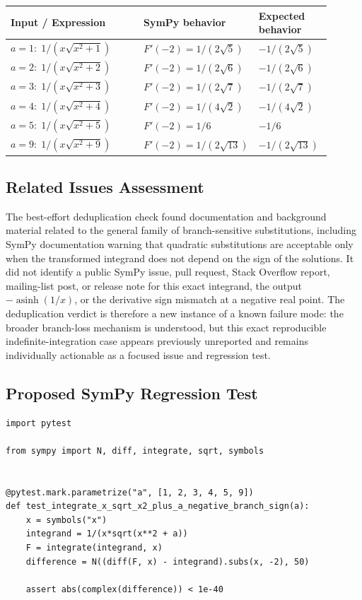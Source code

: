 \documentclass[11pt]{article}
\begin{document}
\begin{center}
\renewcommand{\arraystretch}{1.3}
\begin{tabular}{@{}>{\raggedright\arraybackslash}p{0.44\linewidth}>{\raggedright\arraybackslash}p{0.23\linewidth}>{\raggedright\arraybackslash}p{0.23\linewidth}@{}}
\toprule
\textbf{Input / Expression} & \textbf{SymPy behavior} & \textbf{Expected behavior} \\
\midrule
\(a=1:\;1/(x\sqrt{x^2+1})\) & \(F'(-2)=1/(2\sqrt{5})\) & \(-1/(2\sqrt{5})\) \\
\(a=2:\;1/(x\sqrt{x^2+2})\) & \(F'(-2)=1/(2\sqrt{6})\) & \(-1/(2\sqrt{6})\) \\
\(a=3:\;1/(x\sqrt{x^2+3})\) & \(F'(-2)=1/(2\sqrt{7})\) & \(-1/(2\sqrt{7})\) \\
\(a=4:\;1/(x\sqrt{x^2+4})\) & \(F'(-2)=1/(4\sqrt{2})\) & \(-1/(4\sqrt{2})\) \\
\(a=5:\;1/(x\sqrt{x^2+5})\) & \(F'(-2)=1/6\) & \(-1/6\) \\
\(a=9:\;1/(x\sqrt{x^2+9})\) & \(F'(-2)=1/(2\sqrt{13})\) & \(-1/(2\sqrt{13})\) \\
\bottomrule
\end{tabular}
\end{center}

\subsection{Related Issues Assessment}

The best-effort deduplication check found documentation and background material related to the general family of branch-sensitive substitutions, including SymPy documentation warning that quadratic substitutions are acceptable only when the transformed integrand does not depend on the sign of the solutions. It did not identify a public SymPy issue, pull request, Stack Overflow report, mailing-list post, or release note for this exact integrand, the output \(-\operatorname{asinh}(1/x)\), or the derivative sign mismatch at a negative real point. The deduplication verdict is therefore a new instance of a known failure mode: the broader branch-loss mechanism is understood, but this exact reproducible indefinite-integration case appears previously unreported and remains individually actionable as a focused issue and regression test.

\subsection{Proposed SymPy Regression Test}

\medskip

\begin{lstlisting}[style=bugpython]
import pytest

from sympy import N, diff, integrate, sqrt, symbols


@pytest.mark.parametrize("a", [1, 2, 3, 4, 5, 9])
def test_integrate_x_sqrt_x2_plus_a_negative_branch_sign(a):
    x = symbols("x")
    integrand = 1/(x*sqrt(x**2 + a))
    F = integrate(integrand, x)
    difference = N((diff(F, x) - integrand).subs(x, -2), 50)

    assert abs(complex(difference)) < 1e-40
\end{lstlisting}
\end{document}
